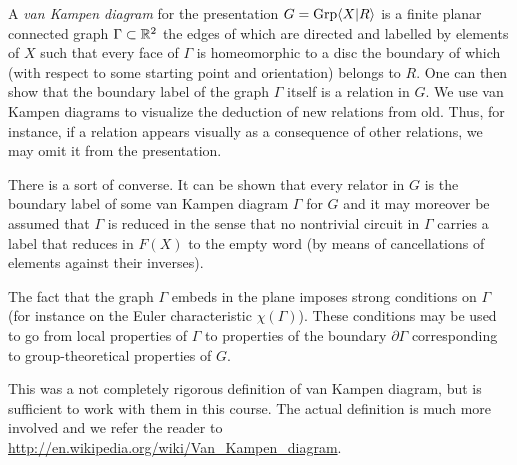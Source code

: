 \begin{defn} A \emph{van Kampen diagram} for the presentation $G = \mathrm{Grp}\langle X|R\rangle$
    is a finite planar connected graph $\Gamma \subset \mathbb{R}^2$ the edges of which
    are directed and labelled by elements of $X$ such that every face of
    $\Gamma$ is homeomorphic to a disc the boundary of which (with respect to
    some starting point and orientation) belongs to $R$. One can then show that
    the boundary label of the graph $\Gamma$ itself is a relation in $G$. We
    use van Kampen diagrams to visualize the deduction of new relations from
    old. Thus, for instance, if a relation appears visually as a consequence of
    other relations, we may omit it from the presentation.

    There is a sort of converse. It can be shown that every relator in $G$ is
    the boundary label of some van Kampen diagram $\Gamma$ for $G$ and it may
    moreover be assumed that $\Gamma$ is reduced in the sense that no
    nontrivial circuit in $\Gamma$ carries a label that reduces in $F(X)$ to
    the empty word (by means of cancellations of elements against their
    inverses).

    The fact that the graph $\Gamma$ embeds in the plane imposes strong
    conditions on $\Gamma$ (for instance on the Euler characteristic
    $\chi(\Gamma)$). These conditions may be used to go from local properties
    of $\Gamma$ to properties of the boundary $\partial\Gamma$ corresponding to
    group-theoretical properties of $G$.

    This was a not completely rigorous definition of van Kampen diagram, but is
    sufficient to work with them in this course. The actual definition is much
    more involved and we refer the reader to
    \url{http://en.wikipedia.org/wiki/Van_Kampen_diagram}.
\end{defn}

